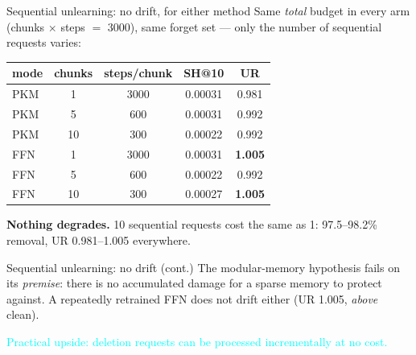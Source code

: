 \documentclass{beamer}
\newcommand{\pierre}[1]{\textcolor{cyan}{#1}}
\begin{document}
\begin{frame}{Sequential unlearning: no drift, for either method}
Same \emph{total} budget in every arm (chunks $\times$ steps $=$ 3000), same
forget set --- only the number of sequential requests varies:
\begin{center}
\begin{tabular}{|l|c|c|c|c|}
\hline
mode & chunks & steps/chunk & SH@10 & UR \\
\hline
PKM & 1  & 3000 & 0.00031 & 0.981 \\
PKM & 5  & 600  & 0.00031 & 0.992 \\
PKM & 10 & 300  & 0.00022 & 0.992 \\
FFN & 1  & 3000 & 0.00031 & \textbf{1.005} \\
FFN & 5  & 600  & 0.00022 & 0.992 \\
FFN & 10 & 300  & 0.00027 & \textbf{1.005} \\
\hline
\end{tabular}
\end{center}

\textbf{Nothing degrades.} 10 sequential requests cost the same as 1:
97.5--98.2\% removal, UR 0.981--1.005 everywhere.

\end{frame}

\begin{frame}{Sequential unlearning: no drift (cont.)}
\alert{The modular-memory hypothesis fails on its \emph{premise}:} there is no
accumulated damage for a sparse memory to protect against. A repeatedly
retrained FFN does not drift either (UR 1.005, \emph{above} clean).

\medskip
\pierre{Practical upside: deletion requests can be processed incrementally at no
cost.}
\end{frame}
\end{document}
